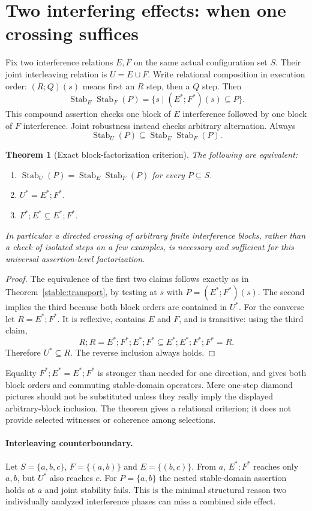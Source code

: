 \documentclass[11pt]{article}
\newtheorem{theorem}{Theorem}[section]
\newcommand{\Stab}{\operatorname{Stab}}
\begin{document}
\section{Two interfering effects: when one crossing suffices}
Fix two interference relations $E,F$ on the same actual configuration set $S$. Their joint interleaving relation is $U=E\cup F$. Write relational composition in execution order: $(R;Q)(s)$ means first an $R$ step, then a $Q$ step. Then
\[
 \Stab_E\Stab_F(P)=\{s\mid (E^*;F^*)(s)\subseteq P\}.
\]
This compound assertion checks one block of $E$ interference followed by one block of $F$ interference. Joint robustness instead checks arbitrary alternation. Always
\[
 \Stab_U(P)\subseteq\Stab_E\Stab_F(P).
\]

\begin{theorem}[Exact block-factorization criterion]\label{stable:cross}
The following are equivalent:
\begin{enumerate}
\item $\Stab_U(P)=\Stab_E\Stab_F(P)$ for every $P\subseteq S$.
\item $U^*=E^*;F^*$.
\item $F^*;E^*\subseteq E^*;F^*$.
\end{enumerate}
In particular a directed crossing of arbitrary finite interference blocks, rather than a check of isolated steps on a few examples, is necessary and sufficient for this universal assertion-level factorization.
\end{theorem}
\begin{proof}
The equivalence of the first two claims follows exactly as in Theorem~\ref{stable:transport}, by testing at $s$ with $P=(E^*;F^*)(s)$. The second implies the third because both block orders are contained in $U^*$. For the converse let $R=E^*;F^*$. It is reflexive, contains $E$ and $F$, and is transitive: using the third claim,
\[
 R;R=E^*;F^*;E^*;F^*\subseteq E^*;E^*;F^*;F^*=R.
\]
Therefore $U^*\subseteq R$. The reverse inclusion always holds.
\end{proof}

Equality $F^*;E^*=E^*;F^*$ is stronger than needed for one direction, and gives both block orders and commuting stable-domain operators. Mere one-step diamond pictures should not be substituted unless they really imply the displayed arbitrary-block inclusion. The theorem gives a relational criterion; it does not provide selected witnesses or coherence among selections.

\paragraph{Interleaving counterboundary.} Let $S=\{a,b,c\}$, $F=\{(a,b)\}$ and $E=\{(b,c)\}$. From $a$, $E^*;F^*$ reaches only $a,b$, but $U^*$ also reaches $c$. For $P=\{a,b\}$ the nested stable-domain assertion holds at $a$ and joint stability fails. This is the minimal structural reason two individually analyzed interference phases can miss a combined side effect.
\end{document}
